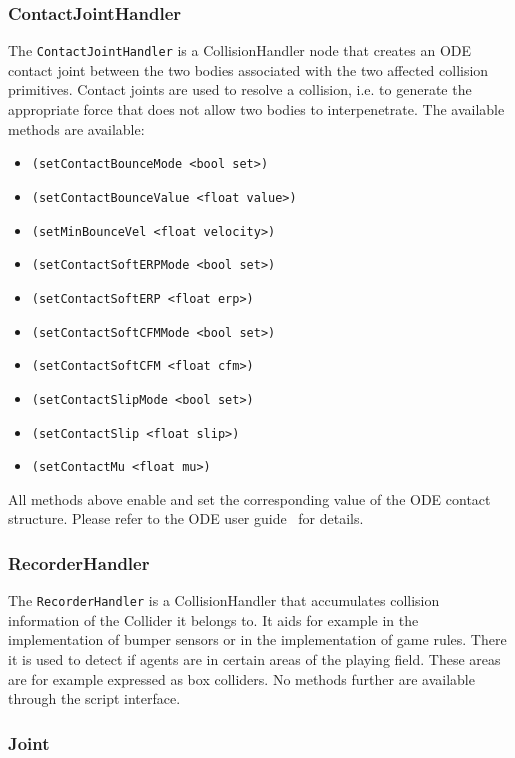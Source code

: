 \subsubsection{ContactJointHandler}
The \texttt{ContactJointHandler} is a CollisionHandler node that
creates an ODE contact joint between the two bodies associated with
the two affected collision primitives. Contact joints are used to
resolve a collision, i.e. to generate the appropriate force that does
not allow two bodies to interpenetrate. The available methods are
available:

\begin{itemize}
  \item \texttt{(setContactBounceMode <bool set>)}
  \item \texttt{(setContactBounceValue <float value>)}
  \item \texttt{(setMinBounceVel <float velocity>)}
  \item \texttt{(setContactSoftERPMode <bool set>)}
  \item \texttt{(setContactSoftERP <float erp>)}
  \item \texttt{(setContactSoftCFMMode <bool set>)}
  \item \texttt{(setContactSoftCFM <float cfm>)}
  \item \texttt{(setContactSlipMode <bool set>)}
  \item \texttt{(setContactSlip <float slip>)}
  \item \texttt{(setContactMu <float mu>)}
\end{itemize}

All methods above enable and set the corresponding value of the ODE
contact structure. Please refer to the ODE user guide~\cite{Smi04} for
details.

\subsubsection{RecorderHandler}

The \texttt{RecorderHandler} is a CollisionHandler that accumulates
collision information of the Collider it belongs to. It aids for
example in the implementation of bumper sensors or in the
implementation of game rules. There it is used to detect if agents are
in certain areas of the playing field. These areas are for example
expressed as box colliders. No methods further are available through
the script interface.

\subsubsection{Joint}

